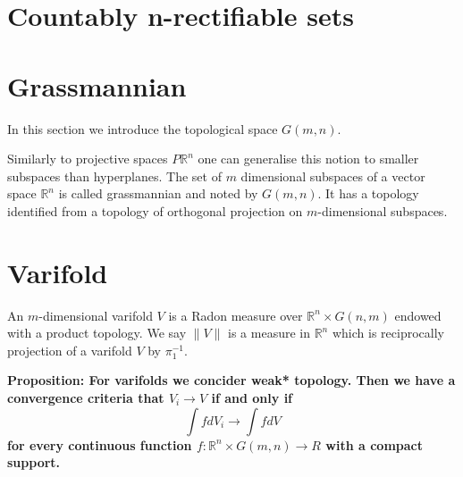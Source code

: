 \documentclass{article}
\begin{document}
\section{Countably n-rectifiable sets}


\section{Grassmannian}

In this section we introduce the topological space $G(m,n)$.
\vspace{1ex}

Similarly to projective spaces $P\mathbb{R}^n$ one can generalise this notion to
smaller subspaces than hyperplanes. The set of $m$ dimensional subspaces of a
vector space $\mathbb{R}^n$ is called grassmannian and noted by $G(m,n)$. It
has a topology identified from a topology of orthogonal projection on
$m$-dimensional subspaces.

\section{Varifold}

An $m$-dimensional varifold $V$ is a Radon measure over $\mathbb{R}^n\times
G(n,m)$ endowed with a product topology. We say $\|V\|$ is a measure in
$\mathbb{R}^n$ which is reciprocally projection of a varifold $V$ by $\pi_1^{-1}$.

\textbf{Proposition: For varifolds we concider weak* topology. Then we have a
convergence criteria that $V_i\rightarrow V$ if and only if
\[\int fdV_i\rightarrow\int fdV\]
for every continuous function $f:\mathbb{R}^n\times G(m,n)\rightarrow R$ with a
compact support.}
\vspace{1ex}
\end{document}
